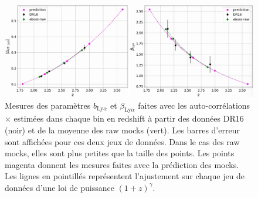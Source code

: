 \begin{figure}
  \centering
  \includegraphics[scale=0.4]{bias_pred}
  \caption{Mesures des paramètres $b_{\mathrm{Ly}\alpha}$ et $\beta_{\mathrm{Ly}\alpha}$ faites avec les auto-corrélations \lya{}$\times$\lya{} estimées dans chaque bin en redshift à partir des données DR16 (noir) et de la moyenne des \Nmocks raw mocks (vert). Les barres d'erreur sont affichées pour ces deux jeux de données. Dans le cas des raw mocks, elles sont plus petites que la taille des points. Les points magenta donnent les mesures faites avec la prédiction des mocks. Les lignes en pointillés représentent l'ajustement sur chaque jeu de données d'une loi de puissance $(1+z)^{\gamma}$.}
  \label{fig:bias_pred}
\end{figure}


